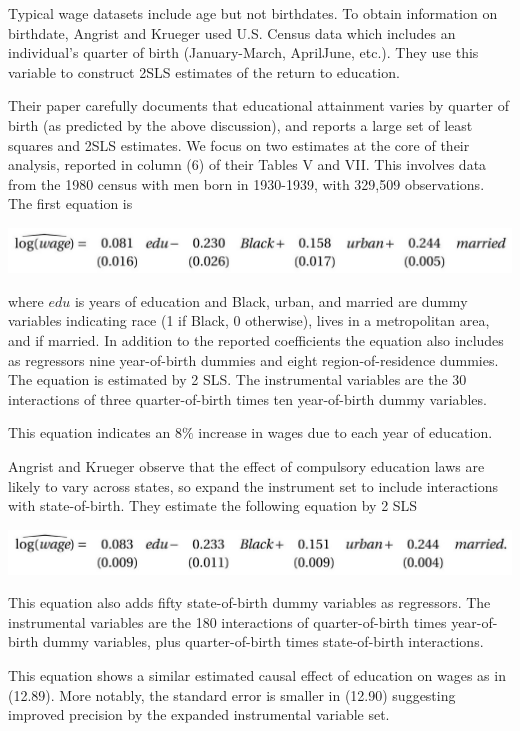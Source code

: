 \documentclass[10pt]{article}
\begin{document}
Typical wage datasets include age but not birthdates. To obtain information on birthdate, Angrist and Krueger used U.S. Census data which includes an individual's quarter of birth (January-March, AprilJune, etc.). They use this variable to construct 2SLS estimates of the return to education.

Their paper carefully documents that educational attainment varies by quarter of birth (as predicted by the above discussion), and reports a large set of least squares and 2SLS estimates. We focus on two estimates at the core of their analysis, reported in column (6) of their Tables $\mathrm{V}$ and VII. This involves data from the 1980 census with men born in 1930-1939, with 329,509 observations. The first equation is

\includegraphics[max width=\textwidth]{2022_09_17_f9391324ededdbb7a34eg-72}

where $e d u$ is years of education and Black, urban, and married are dummy variables indicating race (1 if Black, 0 otherwise), lives in a metropolitan area, and if married. In addition to the reported coefficients the equation also includes as regressors nine year-of-birth dummies and eight region-of-residence dummies. The equation is estimated by 2 SLS. The instrumental variables are the 30 interactions of three quarter-of-birth times ten year-of-birth dummy variables.

This equation indicates an $8 \%$ increase in wages due to each year of education.

Angrist and Krueger observe that the effect of compulsory education laws are likely to vary across states, so expand the instrument set to include interactions with state-of-birth. They estimate the following equation by 2 SLS

\includegraphics[max width=\textwidth]{2022_09_17_f9391324ededdbb7a34eg-73}

This equation also adds fifty state-of-birth dummy variables as regressors. The instrumental variables are the 180 interactions of quarter-of-birth times year-of-birth dummy variables, plus quarter-of-birth times state-of-birth interactions.

This equation shows a similar estimated causal effect of education on wages as in (12.89). More notably, the standard error is smaller in (12.90) suggesting improved precision by the expanded instrumental variable set.
\end{document}
